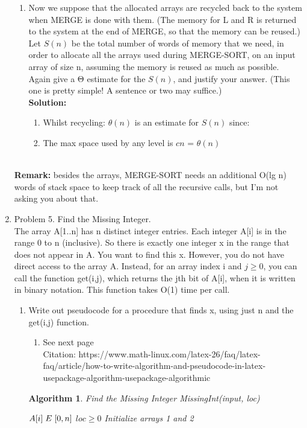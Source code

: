 \documentclass[11pt]{article}
\newtheorem{algorithm}{Algorithm}
\begin{document}
\begin{enumerate}
\begin{enumerate}
        \item Now we suppose that the allocated arrays are recycled back to the system when MERGE is done with them. (The memory for L and R is returned to the system at the end of MERGE, so that the memory can be reused.) Let $S(n)$ be the total number of words of memory that we need, in order to allocate all the arrays used during MERGE-SORT, on an input array of size n, assuming the memory is reused as much as possible. Again give a Θ estimate for the $S(n)$, and justify your answer. (This one is pretty simple! A sentence or two may suffice.)
        \vspace{0.3cm}\\\textbf{Solution:}
        \begin{enumerate}
            \item Whilst recycling: $\theta (n)$ is an estimate for $S(n)$ since:
            \item The max space used by any level is $cn$ = $\theta (n)$
        \end{enumerate}
        
    \end{enumerate}
        \\
        \textbf{Remark: }besides the arrays, MERGE-SORT needs an additional O(lg n) words of stack space to keep track of all the recursive calls, but I'm not asking you about that.

\item Problem 5. Find the Missing Integer.\\
The array A[1..n] has n distinct integer entries. Each integer A[i] is in the range 0 to n (inclusive). So there is exactly one integer x in the range that does not appear in A. You want to find this x. However, you do not have direct access to the array A. Instead, for an array index i and $j \geq0$, you can call the function get(i,j), which returns the jth bit of A[i], when it is written in binary notation. This function takes O(1) time per call.
    \begin{enumerate}
        \item Write out pseudocode for a procedure that finds x, using just n and the get(i,j) function.
        \begin{enumerate}
            \item See next page\\
            Citation: https://www.math-linux.com/latex-26/faq/latex-faq/article/how-to-write-algorithm-and-pseudocode-in-latex-usepackage-algorithm-usepackage-algorithmic
        \end{enumerate}
        \begin{algorithm}
            \caption{Find the Missing Integer \rightarrow MissingInt(input, loc)}
            \begin{algorithmic} 
                \REQUIRE $A[i] \hspace{0.1cm}E \hspace{0.1cm} [0, n]$
                \ENSURE $loc \geq 0$
                \ELSE
                \STATE Initialize arrays 1 and 2
                \ENDIF
                

\end{algorithmic}
\end{algorithm}
\end{enumerate}
\end{enumerate}
\end{document}
